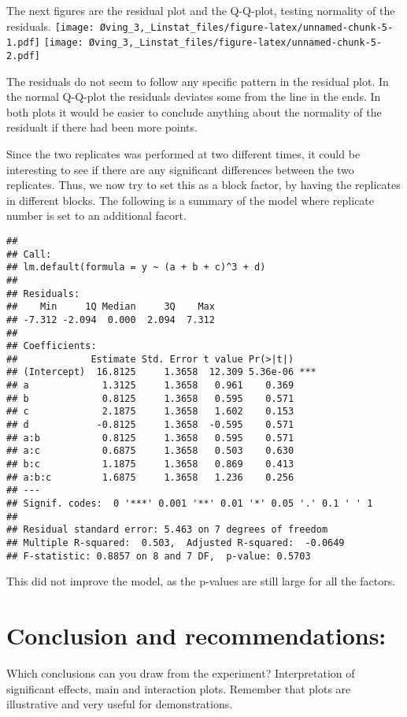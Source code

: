 \documentclass[]{article}
\begin{document}
The next figures are the residual plot and the Q-Q-plot, testing
normality of the residuals.
\texttt{[image: Øving\_3,\_Linstat\_files/figure-latex/unnamed-chunk-5-1.pdf]}
\texttt{[image: Øving\_3,\_Linstat\_files/figure-latex/unnamed-chunk-5-2.pdf]}

The residuals do not seem to follow any specific pattern in the residual
plot. In the normal Q-Q-plot the residuals deviates some from the line
in the ends. In both plots it would be easier to conclude anything about
the normality of the residualt if there had been more points.

Since the two replicates was performed at two different times, it could
be interesting to see if there are any significant differences between
the two replicates. Thus, we now try to set this as a block factor, by
having the replicates in different blocks. The following is a summary of
the model where replicate number is set to an additional facort.

\begin{verbatim}
## 
## Call:
## lm.default(formula = y ~ (a + b + c)^3 + d)
## 
## Residuals:
##    Min     1Q Median     3Q    Max 
## -7.312 -2.094  0.000  2.094  7.312 
## 
## Coefficients:
##             Estimate Std. Error t value Pr(>|t|)    
## (Intercept)  16.8125     1.3658  12.309 5.36e-06 ***
## a             1.3125     1.3658   0.961    0.369    
## b             0.8125     1.3658   0.595    0.571    
## c             2.1875     1.3658   1.602    0.153    
## d            -0.8125     1.3658  -0.595    0.571    
## a:b           0.8125     1.3658   0.595    0.571    
## a:c           0.6875     1.3658   0.503    0.630    
## b:c           1.1875     1.3658   0.869    0.413    
## a:b:c         1.6875     1.3658   1.236    0.256    
## ---
## Signif. codes:  0 '***' 0.001 '**' 0.01 '*' 0.05 '.' 0.1 ' ' 1
## 
## Residual standard error: 5.463 on 7 degrees of freedom
## Multiple R-squared:  0.503,  Adjusted R-squared:  -0.0649 
## F-statistic: 0.8857 on 8 and 7 DF,  p-value: 0.5703
\end{verbatim}

This did not improve the model, as the p-values are still large for all
the factors.

\section{Conclusion and
recommendations:}\label{conclusion-and-recommendations}

Which conclusions can you draw from the experiment? Interpretation of
significant effects, main and interaction plots. Remember that plots are
illustrative and very useful for demonstrations.
\end{document}
